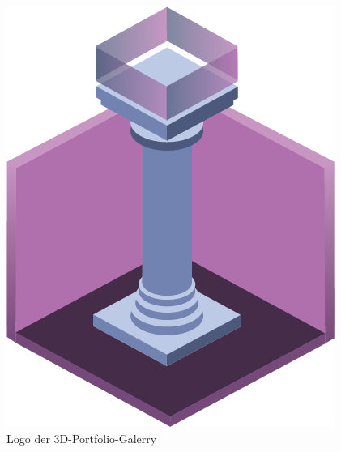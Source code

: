 \begin{figure} [h]
    \centering
    \includegraphics[scale=0.3]{pics/3d-logo.png}
    \caption{Logo der 3D-Portfolio-Galerry}
\end{figure}



